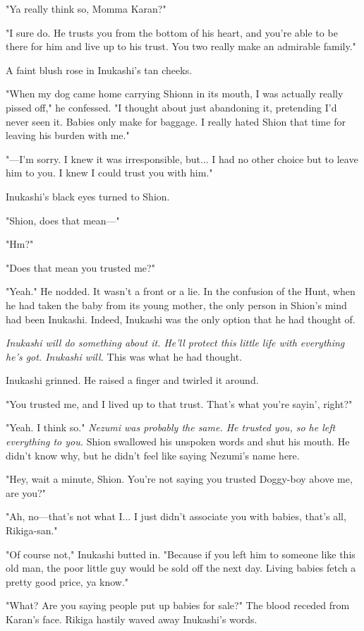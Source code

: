 "Ya really think so, Momma Karan?"

"I sure do. He trusts you from the bottom of his heart, and you're able
to be there for him and live up to his trust. You two really make an
admirable family."

A faint blush rose in Inukashi's tan cheeks.

"When my dog came home carrying Shionn in its mouth, I was actually
really pissed off," he confessed. "I thought about just abandoning it,
pretending I'd never seen it. Babies only make for baggage. I really
hated Shion that time for leaving his burden with me."

"---I'm sorry. I knew it was irresponsible, but... I had no other choice
but to leave him to you. I knew I could trust you with him."

Inukashi's black eyes turned to Shion.

"Shion, does that mean---"

"Hm?"

"Does that mean you trusted me?"

"Yeah." He nodded. It wasn't a front or a lie. In the confusion of the
Hunt, when he had taken the baby from its young mother, the only person
in Shion's mind had been Inukashi. Indeed, Inukashi was the only option
that he had thought of.

\emph{Inukashi will do something about it. He'll protect this little life with
everything he's got. Inukashi will.} This was what he had thought.

Inukashi grinned. He raised a finger and twirled it around.

"You trusted me, and I lived up to that trust. That's what you're
sayin', right?"

"Yeah. I think so." \emph{Nezumi was probably the same. He trusted you, so he
left everything to you.} Shion swallowed his unspoken words and shut his
mouth. He didn't know why, but he didn't feel like saying Nezumi's name
here.

"Hey, wait a minute, Shion. You're not saying you trusted Doggy-boy
above me, are you?"

"Ah, no---that's not what I... I just didn't associate you with babies,
that's all, Rikiga-san."

"Of course not," Inukashi butted in. "Because if you left him to someone
like this old man, the poor little guy would be sold off the next day.
Living babies fetch a pretty good price, ya know."

"What? Are you saying people put up babies for sale?" The blood receded
from Karan's face. Rikiga hastily waved away Inukashi's words.

